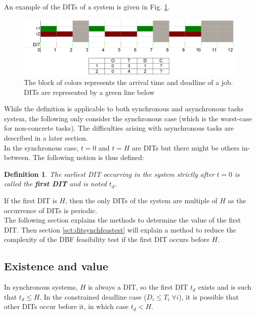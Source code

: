 \documentclass[a4paper,10pt]{article}
\newtheorem{definition}{Definition}
\begin{document}
 An example of the DITs of a system is given in Fig. \ref{fig:ditExample}.

 \begin{figure}[h]
\begin{center}
\includegraphics[width=\textwidth]{figs/dit_example.png}
\caption{The block of colors represents the arrival time and deadline of a job. DITs are represented by a green line below}
\label{fig:ditExample}
\end{center}
\end{figure}

While the definition is applicable to both synchronous and asynchronous tasks system, the following only consider the synchronous case (which is the worst-case for non-concrete tasks). The difficulties arising with asynchronous tasks are described in a later section.\\

In the synchronous case, $t=0$ and $t=H$ are DITs but there might be others in-between. The following notion is thus defined:

\begin{definition}
The earliest DIT occurring in the system strictly after $t=0$ is called the \textbf{first DIT} and is noted $t_d$.
\end{definition}

If the first DIT is $H$, then the only DITs of the system are multiple of $H$ as the occurrence of DITs is periodic.\\

The following section explains the methods to determine the value of the first DIT. Then section \ref{sct:ditsynchfeastest} will explain a method to reduce the complexity of the DBF feasibility test if the first DIT occurs before $H$.

\subsection{Existence and value}

In synchronous systems, $H$ is always a DIT, so the first DIT $t_d$ exists and is such that $t_d \leq H$. In the constrained deadline case ($D_i \leq T_i \; \forall i$), it is possible that other DITs occur before it, in which case $t_d < H$.\\
\end{document}

